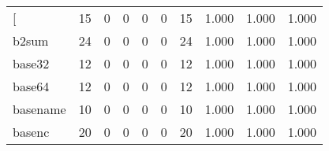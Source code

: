 \begin{longtable}{lp{2.0cm}p{2.0cm}p{2.0cm}p{2.0cm}p{2.0cm}p{2.0cm}p{2.0cm}p{2.0cm}p{2.0cm}}
\bottomrule
\endlastfoot
{[}         &                     15 &                                             0 &                                            0 &                                           0 &                                            0 &                                         15 &                                1.000 &                                  1.000 &                                1.000 \\
b2sum     &                     24 &                                             0 &                                            0 &                                           0 &                                            0 &                                         24 &                                1.000 &                                  1.000 &                                1.000 \\
base32    &                     12 &                                             0 &                                            0 &                                           0 &                                            0 &                                         12 &                                1.000 &                                  1.000 &                                1.000 \\
base64    &                     12 &                                             0 &                                            0 &                                           0 &                                            0 &                                         12 &                                1.000 &                                  1.000 &                                1.000 \\
basename  &                     10 &                                             0 &                                            0 &                                           0 &                                            0 &                                         10 &                                1.000 &                                  1.000 &                                1.000 \\
basenc    &                     20 &                                             0 &                                            0 &                                           0 &                                            0 &                                         20 &                                1.000 &                                  1.000 &                                1.000 \\

\end{longtable}
